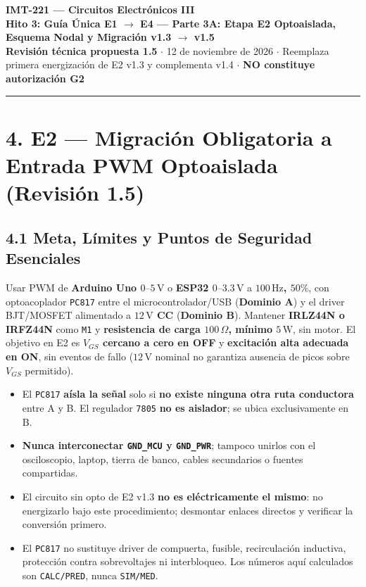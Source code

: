 \documentclass[10pt, a4paper, landscape]{article}
\begin{document}
\noindent
{\LARGE \textbf{\textcolor{ucbblue}{IMT-221 — Circuitos Electrónicos III}}}\\[0.12cm]
{\Large \textbf{Hito 3: Guía Única E1 $\rightarrow$ E4 — Parte 3A: Etapa E2 Optoaislada, Esquema Nodal y Migración v1.3 $\rightarrow$ v1.5}}\\[0.08cm]
{\small \textbf{Revisión técnica propuesta 1.5} $\cdot$ 12 de noviembre de 2026 $\cdot$ Reemplaza primera energización de E2 v1.3 y complementa v1.4 $\cdot$ \textbf{\textcolor{warnred}{NO constituye autorización G2}}}
\par\vspace{0.15cm}\noindent\rule{\linewidth}{0.4pt}\vspace{0.2cm}

\section*{4. E2 — Migración Obligatoria a Entrada PWM Optoaislada (Revisión 1.5)}

\subsection*{4.1 Meta, Límites y Puntos de Seguridad Esenciales}
Usar PWM de \textbf{Arduino Uno $0\text{--}5\,\text{V}$} o \textbf{ESP32 $0\text{--}3.3\,\text{V}$} a \textbf{$100\,\text{Hz}$, $50\%$}, con optoacoplador \texttt{PC817} entre el microcontrolador/USB (\textbf{Dominio A}) y el driver BJT/MOSFET alimentado a \textbf{$12\,\text{V}$ CC} (\textbf{Dominio B}). Mantener \textbf{IRLZ44N o IRFZ44N} como \texttt{M1} y \textbf{resistencia de carga $100\,\Omega$, mínimo $5\,\text{W}$}, sin motor. El objetivo en E2 es \textbf{$V_{GS}$ cercano a cero en OFF} y \textbf{excitación alta adecuada en ON}, sin eventos de fallo ($12\,\text{V}$ nominal no garantiza ausencia de picos sobre $V_{GS}$ permitido).
\begin{itemize}[noitemsep, topsep=2pt]
    \item El \texttt{PC817} \textbf{aísla la señal} solo si \textbf{no existe ninguna otra ruta conductora} entre A y B. El regulador \texttt{7805} \textbf{no es aislador}; se ubica exclusivamente en B.
    \item \textbf{\textcolor{warnred}{Nunca interconectar \texttt{GND\_MCU} y \texttt{GND\_PWR}}}; tampoco unirlos con el osciloscopio, laptop, tierra de banco, cables secundarios o fuentes compartidas.
    \item El circuito sin opto de E2 v1.3 \textbf{no es eléctricamente el mismo}: no energizarlo bajo este procedimiento; desmontar enlaces directos y verificar la conversión primero.
    \item El \texttt{PC817} no sustituye driver de compuerta, fusible, recirculación inductiva, protección contra sobrevoltajes ni interbloqueo. Los números aquí calculados son \texttt{CALC/PRED}, nunca \texttt{SIM/MED}.
\end{itemize}
\end{document}
